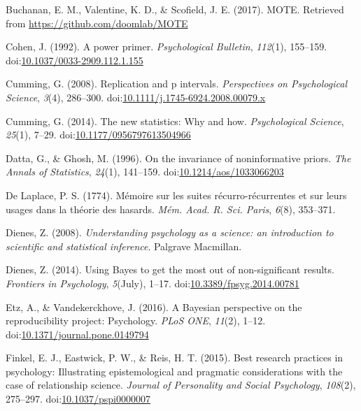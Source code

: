 \documentclass[,man, mask]{apa6}
\begin{document}
\leavevmode\hypertarget{ref-Buchanan2017}{}%
Buchanan, E. M., Valentine, K. D., \& Scofield, J. E. (2017). MOTE. Retrieved from \url{https://github.com/doomlab/MOTE}

\leavevmode\hypertarget{ref-Cohen1992a}{}%
Cohen, J. (1992). A power primer. \emph{Psychological Bulletin}, \emph{112}(1), 155--159. doi:\href{https://doi.org/10.1037/0033-2909.112.1.155}{10.1037/0033-2909.112.1.155}

\leavevmode\hypertarget{ref-Cumming2008}{}%
Cumming, G. (2008). Replication and p intervals. \emph{Perspectives on Psychological Science}, \emph{3}(4), 286--300. doi:\href{https://doi.org/10.1111/j.1745-6924.2008.00079.x}{10.1111/j.1745-6924.2008.00079.x}

\leavevmode\hypertarget{ref-Cumming2014}{}%
Cumming, G. (2014). The new statistics: Why and how. \emph{Psychological Science}, \emph{25}(1), 7--29. doi:\href{https://doi.org/10.1177/0956797613504966}{10.1177/0956797613504966}

\leavevmode\hypertarget{ref-Datta1996}{}%
Datta, G., \& Ghosh, M. (1996). On the invariance of noninformative priors. \emph{The Annals of Statistics}, \emph{24}(1), 141--159. doi:\href{https://doi.org/10.1214/aos/1033066203}{10.1214/aos/1033066203}

\leavevmode\hypertarget{ref-DeLaplace1774}{}%
De Laplace, P. S. (1774). Mémoire sur les suites récurro-récurrentes et sur leurs usages dans la théorie des hasards. \emph{Mém. Acad. R. Sci. Paris}, \emph{6}(8), 353--371.

\leavevmode\hypertarget{ref-Dienes2008}{}%
Dienes, Z. (2008). \emph{Understanding psychology as a science: an introduction to scientific and statistical inference}. Palgrave Macmillan.

\leavevmode\hypertarget{ref-Dienes2014}{}%
Dienes, Z. (2014). Using Bayes to get the most out of non-significant results. \emph{Frontiers in Psychology}, \emph{5}(July), 1--17. doi:\href{https://doi.org/10.3389/fpsyg.2014.00781}{10.3389/fpsyg.2014.00781}

\leavevmode\hypertarget{ref-Etz2016}{}%
Etz, A., \& Vandekerckhove, J. (2016). A Bayesian perspective on the reproducibility project: Psychology. \emph{PLoS ONE}, \emph{11}(2), 1--12. doi:\href{https://doi.org/10.1371/journal.pone.0149794}{10.1371/journal.pone.0149794}

\leavevmode\hypertarget{ref-Finkel2015}{}%
Finkel, E. J., Eastwick, P. W., \& Reis, H. T. (2015). Best research practices in psychology: Illustrating epistemological and pragmatic considerations with the case of relationship science. \emph{Journal of Personality and Social Psychology}, \emph{108}(2), 275--297. doi:\href{https://doi.org/10.1037/pspi0000007}{10.1037/pspi0000007}
\end{document}
